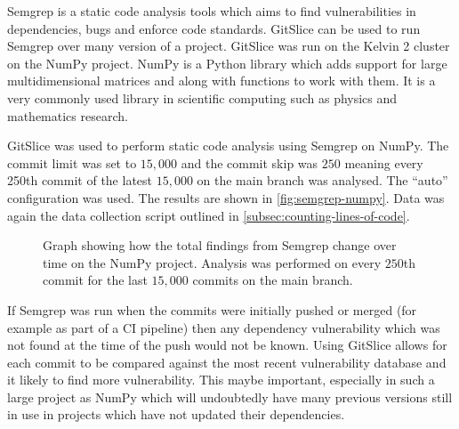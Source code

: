 Semgrep is a static code analysis tools which aims to find vulnerabilities in dependencies, bugs and enforce code standards.
GitSlice can be used to run Semgrep over many version of a project.
GitSlice was run on the Kelvin 2 cluster on the NumPy project.
NumPy is a Python library which adds support for large multidimensional matrices and along with functions to work with them.
It is a very commonly used library in scientific computing such as physics and mathematics research.

GitSlice was used to perform static code analysis using Semgrep on NumPy.
The commit limit was set to $ 15,000 $ and the commit skip was $ 250 $ meaning every 250th commit of the latest $ 15,000 $ on the main branch was analysed.
The ``auto'' configuration was used.
The results are shown in \autoref{fig:semgrep-numpy}.
Data was again the data collection script outlined in \autoref{subsec:counting-lines-of-code}.

\begin{figure}
    \centering
    \caption{Graph showing how the total findings from Semgrep change over time on the NumPy project.  Analysis was performed on every $250$th commit for the last $15,000$ commits on the main branch.}
    \label{fig:semgrep-numpy}
\end{figure}

If Semgrep was run when the commits were initially pushed or merged (for example as part of a CI pipeline) then any dependency vulnerability which was not found at the time of the push would not be known.
Using GitSlice allows for each commit to be compared against the most recent vulnerability database and it likely to find more vulnerability.
This maybe important, especially in such a large project as NumPy which will undoubtedly have many previous versions still in use in projects which have not updated their dependencies.
